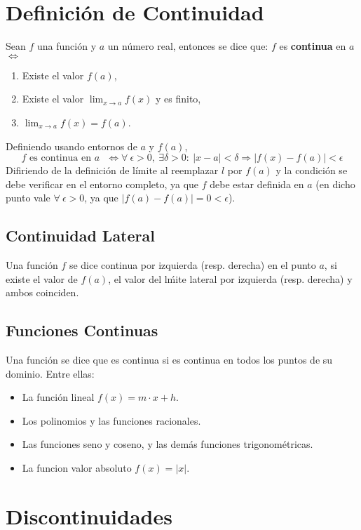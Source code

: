 \documentclass[11pt,a4paper]{article}
\begin{document}
\section{Definici\'on de Continuidad}
Sean $f$ una funci\'on y $a$ un n\'umero real, entonces se dice que: $f$ es \textbf{continua} en $a$ $\iff$
\begin{enumerate}
\item Existe el valor $f(a)$,
\item Existe el valor $\displaystyle{\lim_{x \to a} f(x)}$ y es finito,
\item $\displaystyle{\lim_{x \to a} f(x) = f(a)}$.
\end{enumerate}
Definiendo usando entornos de $a$ y $f(a)$, $$\text{$f$ es continua en $a$ } \iff \forall\ \epsilon > 0,\ \exists \delta > 0 :\ |x-a|<\delta \Rightarrow |f(x)-f(a)| < \epsilon$$
Difiriendo de la definici\'on de l\'imite al reemplazar $l$ por $f(a)$ y la condici\'on se debe verificar en el entorno completo, ya que $f$ debe estar definida en $a$ (en dicho punto vale $\forall\ \epsilon>0$, ya que $|f(a)-f(a)| = 0 < \epsilon$).

\subsection{Continuidad Lateral}
Una funci\'on $f$ se dice continua por izquierda (resp. derecha) en el punto $a$, si existe el valor de $f(a)$, el valor del l\'mite lateral por izquierda (resp. derecha) y ambos coinciden.
\subsection{Funciones Continuas}
Una funci\'on se dice que es continua si es continua en todos los puntos de su dominio. Entre ellas:
\begin{itemize}
\item La funci\'on lineal $f(x)=m\cdot x + h$.
\item Los polinomios y las funciones racionales.
\item Las funciones seno y coseno, y las dem\'as funciones trigonom\'etricas.
\item La funcion valor absoluto $f(x)=|x|$.
\end{itemize}

\newpage

\section{Discontinuidades}
\end{document}
